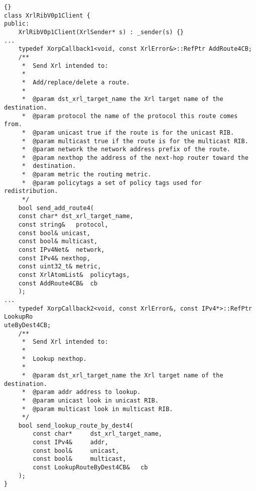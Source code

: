 \documentclass[11pt]{article}
\begin{document}
\begin{lstlisting}[caption={Extracts from {\stt xorp/xrl/interfaces/rib\_xif.hh} %
                                     \label{lst:ribxif.hh} } ]{}
class XrlRibV0p1Client {
public:
    XrlRibV0p1Client(XrlSender* s) : _sender(s) {}
...
    typedef XorpCallback1<void, const XrlError&>::RefPtr AddRoute4CB;
    /**
     *  Send Xrl intended to:
     *
     *  Add/replace/delete a route.
     *
     *  @param dst_xrl_target_name the Xrl target name of the destination.
     *  @param protocol the name of the protocol this route comes from.
     *  @param unicast true if the route is for the unicast RIB.
     *  @param multicast true if the route is for the multicast RIB.
     *  @param network the network address prefix of the route.
     *  @param nexthop the address of the next-hop router toward the
     *  destination.
     *  @param metric the routing metric.
     *  @param policytags a set of policy tags used for redistribution.
     */
    bool send_add_route4(
	const char*	dst_xrl_target_name,
	const string&	protocol,
	const bool&	unicast,
	const bool&	multicast,
	const IPv4Net&	network,
	const IPv4&	nexthop,
	const uint32_t&	metric,
	const XrlAtomList&	policytags,
	const AddRoute4CB&	cb
    );
...
    typedef XorpCallback2<void, const XrlError&, const IPv4*>::RefPtr LookupRo
uteByDest4CB;
    /**
     *  Send Xrl intended to:
     *
     *  Lookup nexthop.
     *
     *  @param dst_xrl_target_name the Xrl target name of the destination.
     *  @param addr address to lookup.
     *  @param unicast look in unicast RIB.
     *  @param multicast look in multicast RIB.
     */
    bool send_lookup_route_by_dest4(
        const char*     dst_xrl_target_name,
        const IPv4&     addr,
        const bool&     unicast,
        const bool&     multicast,
        const LookupRouteByDest4CB&   cb
    );
}
\end{lstlisting}

\newpage
\end{document}
